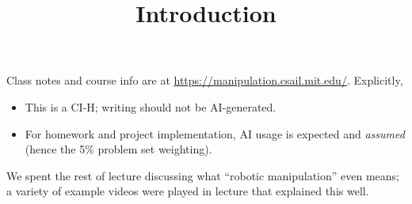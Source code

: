 \title{Introduction}



Class notes and course info are at
\href{https://manipulation.csail.mit.edu/}{https://manipulation.csail.mit.edu/}.
Explicitly,
\begin{itemize}
    \item This is a CI-H; writing should not be AI-generated.
    \item For homework and project implementation,
    AI usage is expected and \emph{assumed}
    (hence the 5\% problem set weighting).
\end{itemize}

We spent the rest of lecture
discussing what ``robotic manipulation'' even means;
a variety of example videos were played in lecture
that explained this well.



